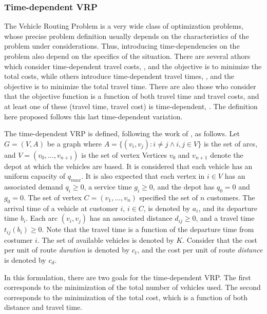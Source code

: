 \subsubsection{Time-dependent VRP}
\label{sec:time-dependent-vrp}


The Vehicle Routing Problem is a very wide class of optimization problems, whose precise problem definition usually depends
on the characteristics of the problem under considerations. Thus, introducing time-dependencies 
on the problem also depend on the specifics of the situation. There are several athors which consider 
time-dependent travel costs, \cite{tdvrp_costs}, and the objective is to minimize the total costs,
while others introduce time-dependent travel times, \cite{tdvrp_1},
and the objective is to minimize the total travel time. There are also those 
who consider that the objective function is a function of both travel time and travel costs,
and at least one of these (travel time, travel cost) is time-dependent, \cite{tdvrptw_1}.
The definition here proposed follows this last time-dependent variation.

The time-dependent VRP is defined, following the work of \cite{tdvrptw_1}, as follows.
Let $G=(V,A)$ be a graph where $A=\{(v_i, v_j): i \neq j \wedge i,j \in V\}$
is the set of arcs, and $V = (v_0, ..., v_{n+1})$ is the set of vertex
Vertices $v_{0}$ and $v_{n+1}$ denote the depot at which the vehicles are based.
It is considered that each vehicle has an uniform capacity of $q_{max}$.
It is also expected that each vertex in $i \in V$ has an associated demand $q_i \geq 0$,
a service time $g_i \geq 0$, and the depot has $q_0 = 0$ and $g_0 = 0$.
The set of vertex $ C = (v_1, ..., v_{n})$ specified the set of $n$ customers.
The arrival time of a vehicle at customer $i$, $i \in C$, is denoted by $a_i$,
and its departure time $b_i$. Each arc $(v_i, v_j)$ has an associated distance $d_{ij} \geq 0$,
and a travel time $t_{ij}(b_i) \geq 0$. Note that the travel time is a function 
of the departure time from costumer $i$.
The set of available vehicles is denoted by $K$. 
Consider that the cost per unit of route \textit{duration} is denoted by $c_{t}$,
and the cost per unit of route \textit{distance} is denoted by $c_{d}$. 

In this formulation, there are two goals for the time-dependent VRP. The first corresponds
to the minimization of the total number of vehicles used. The second corresponds
to the minimization of the total cost, which is a function of both distance and travel time.

